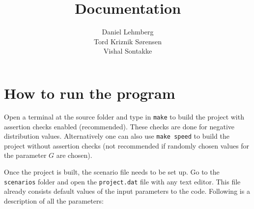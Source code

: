 \documentclass[11pt]{article}
\title{\textbf{Documentation}}
\author{Daniel Lehmberg\\
		Tord Kriznik Sørensen\\
		Vishal Sontakke}
\date{}
\begin{document}
\maketitle

\section{How to run the program}
Open a terminal at the source folder and type in \verb|make| to build the project with assertion checks enabled (recommended). These checks are done for negative distribution values. Alternatively one can also use \verb|make speed| to build the project without assertion checks (not recommended if randomly chosen values for the parameter $G$ are chosen).

Once the project is built, the scenario file needs to be set up. Go to the \verb|scenarios| folder and open the \verb|project.dat| file with any text editor. This file already consists default values of the input parameters to the code. Following is a description of all the parameters:
\end{document}
